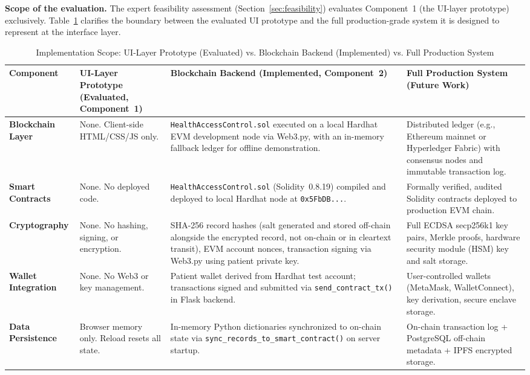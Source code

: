 \documentclass[journal,onecolumn]{IEEEtran}
\begin{document}
\textbf{Scope of the evaluation.} The expert feasibility assessment (Section~\ref{sec:feasibility}) evaluates Component~1 (the UI-layer prototype) exclusively. Table~\ref{tab:prototype-vs-full} clarifies the boundary between the evaluated UI prototype and the full production-grade system it is designed to represent at the interface layer.

\begin{table}[htbp]
\centering
\small
\caption{Implementation Scope: UI-Layer Prototype (Evaluated) vs. Blockchain Backend (Implemented) vs. Full Production System}
\label{tab:prototype-vs-full}
\begin{adjustbox}{max width=\columnwidth}
\begin{tabular}{|p{2.8cm}|p{3.8cm}|p{3.8cm}|p{3.8cm}|}
\hline
\textbf{Component} & \textbf{UI-Layer Prototype (Evaluated, Component~1)} & \textbf{Blockchain Backend (Implemented, Component~2)} & \textbf{Full Production System (Future Work)} \\
\hline
\textbf{Blockchain Layer} & None. Client-side HTML/CSS/JS only. & \texttt{HealthAccessControl.sol} executed on a local Hardhat EVM development node via Web3.py, with an in-memory fallback ledger for offline demonstration. & Distributed ledger (e.g., Ethereum mainnet or Hyperledger Fabric) with consensus nodes and immutable transaction log. \\
\hline
\textbf{Smart Contracts} & None. No deployed code. & \texttt{HealthAccessControl.sol} (Solidity~0.8.19) compiled and deployed to local Hardhat node at \texttt{0x5FbDB...}. & Formally verified, audited Solidity contracts deployed to production EVM chain. \\
\hline
\textbf{Cryptography} & None. No hashing, signing, or encryption. & SHA-256 record hashes (salt generated and stored off-chain alongside the encrypted record, not on-chain or in cleartext transit), EVM account nonces, transaction signing via Web3.py using patient private key. & Full ECDSA secp256k1 key pairs, Merkle proofs, hardware security module (HSM) key and salt storage. \\
\hline
\textbf{Wallet Integration} & None. No Web3 or key management. & Patient wallet derived from Hardhat test account; transactions signed and submitted via \texttt{send\_contract\_tx()} in Flask backend. & User-controlled wallets (MetaMask, WalletConnect), key derivation, secure enclave storage. \\
\hline
\textbf{Data Persistence} & Browser memory only. Reload resets all state. & In-memory Python dictionaries synchronized to on-chain state via \texttt{sync\_records\_to\_\allowbreak smart\_contract()} on server startup. & On-chain transaction log + PostgreSQL off-chain metadata + IPFS encrypted storage. \\

\end{tabular}
\end{adjustbox}
\end{table}
\end{document}
